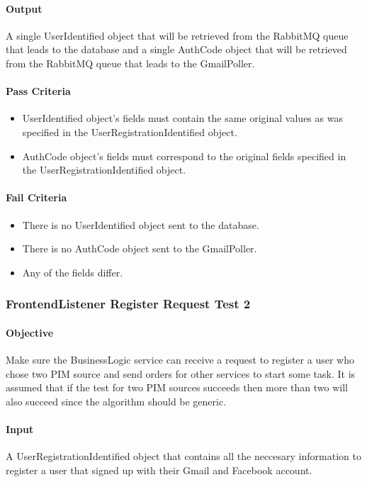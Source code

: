 \documentclass[hidelinks,english]{article}
\begin{document}
				\paragraph{Output} A single UserIdentified object that will be retrieved from the RabbitMQ queue that leads to the database and a single AuthCode object that will be retrieved from the RabbitMQ queue that leads to the GmailPoller.
				\paragraph{Pass Criteria}
				\begin{itemize}
					\item UserIdentified object's fields must contain the same original values as was specified in the UserRegistrationIdentified object.
					\item AuthCode object's fields must correspond to the original fields specified in the UserRegistrationIdentified object.
				\end{itemize}
				\paragraph{Fail Criteria}
				\begin{itemize}
					\item There is no UserIdentified object sent to the database.
					\item There is no AuthCode object sent to the GmailPoller.
					\item Any of the fields differ.
				\end{itemize}
				
			\subsubsection{FrontendListener Register Request Test 2}\label{businessfrontendlistenerregistertest2}
				\paragraph{Objective} Make sure the BusinessLogic service can receive a request to register a user who chose two PIM source and send orders for other services to start some task. It is assumed that if the test for two PIM sources succeeds then more than two will also succeed since the algorithm should be generic.
				\paragraph{Input} A UserRegistrationIdentified object that contains all the neccesary information to register a user that signed up with their Gmail and Facebook account.
\end{document}
